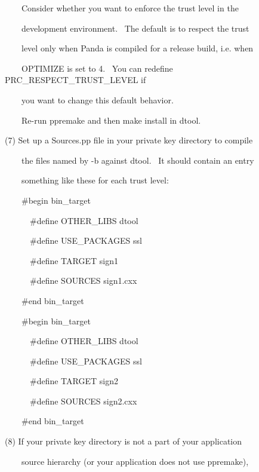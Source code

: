\documentclass[a4paper]{article}
\begin{document}
\bigskip

{\color{black}
\ \ \ \ Consider whether you want to enforce the trust level in the}

{\color{black}
\ \ \ \ development environment. \ The default is to respect the trust}

{\color{black}
\ \ \ \ level only when Panda is compiled for a release build, i.e. when}

{\color{black}
\ \ \ \ OPTIMIZE is set to 4. \ You can redefine PRC\_RESPECT\_TRUST\_LEVEL if}

{\color{black}
\ \ \ \ you want to change this default behavior.}


\bigskip

{\color{black}
\ \ \ \ Re-run ppremake and then make install in dtool.}

{\color{black}
(7) Set up a Sources.pp file in your private key directory to compile}

{\color{black}
\ \ \ \ the files named by -b against dtool. \ It should contain an entry}

{\color{black}
\ \ \ \ something like these for each trust level:}


\bigskip

{\color{black}
\ \ \ \ \#begin bin\_target}

{\color{black}
\ \ \ \ \ \ \#define OTHER\_LIBS dtool}

{\color{black}
\ \ \ \ \ \ \#define USE\_PACKAGES ssl}

{\color{black}
\ \ \ \ \ \ \#define TARGET sign1}

{\color{black}
\ \ \ \ \ \ \#define SOURCES sign1.cxx}

{\color{black}
\ \ \ \ \#end bin\_target}


\bigskip

{\color{black}
\ \ \ \ \#begin bin\_target}

{\color{black}
\ \ \ \ \ \ \#define OTHER\_LIBS dtool}

{\color{black}
\ \ \ \ \ \ \#define USE\_PACKAGES ssl}

{\color{black}
\ \ \ \ \ \ \#define TARGET sign2}

{\color{black}
\ \ \ \ \ \ \#define SOURCES sign2.cxx}

{\color{black}
\ \ \ \ \#end bin\_target}


\bigskip

{\color{black}
(8) If your private key directory is not a part of your application}

{\color{black}
\ \ \ \ source hierarchy (or your application does not use ppremake),}
\end{document}

